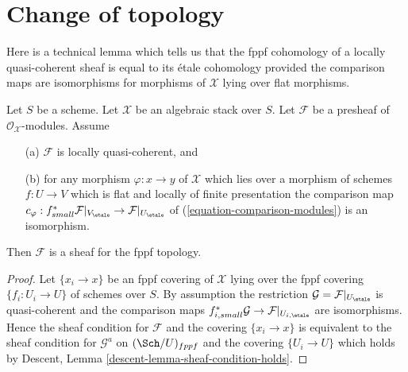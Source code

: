 \section{Change of topology}
\label{section-change-topology}

\noindent
Here is a technical lemma which tells us that the
fppf cohomology of a locally quasi-coherent sheaf is equal to its
\'etale cohomology provided the comparison maps are isomorphisms
for morphisms of $\mathcal{X}$ lying over flat morphisms.

\begin{lemma}
\label{lemma-lqc-flat-base-change-fppf-sheaf}
Let $S$ be a scheme. Let $\mathcal{X}$ be an algebraic stack over $S$.
Let $\mathcal{F}$ be a presheaf of $\mathcal{O}_\mathcal{X}$-modules.
Assume
\begin{enumerate}
\item[(a)] $\mathcal{F}$ is locally quasi-coherent, and
\item[(b)] for any morphism $\varphi : x \to y$ of $\mathcal{X}$ which lies
over a morphism of schemes $f : U \to V$ which is flat and
locally of finite presentation the comparison map
$c_\varphi : f_{small}^*\mathcal{F}|_{V_\etale} \to
\mathcal{F}|_{U_\etale}$ of
(\ref{equation-comparison-modules}) is an isomorphism.
\end{enumerate}
Then $\mathcal{F}$ is a sheaf for the fppf topology.
\end{lemma}

\begin{proof}
Let $\{x_i \to x\}$ be an fppf covering of $\mathcal{X}$ lying over the
fppf covering $\{f_i : U_i \to U\}$ of schemes over $S$.
By assumption the restriction $\mathcal{G} = \mathcal{F}|_{U_\etale}$
is quasi-coherent and the comparison maps
$f_{i, small}^*\mathcal{G} \to \mathcal{F}|_{U_{i, \etale}}$
are isomorphisms. Hence the sheaf condition for $\mathcal{F}$
and the covering $\{x_i \to x\}$ is equivalent to the sheaf condition
for $\mathcal{G}^a$ on $(\Sch/U)_{fppf}$ and the covering $\{U_i \to U\}$
which holds by
Descent, Lemma \ref{descent-lemma-sheaf-condition-holds}.
\end{proof}


